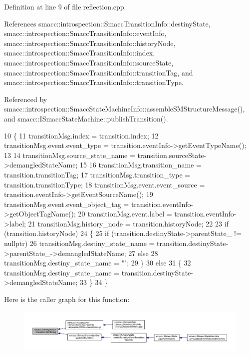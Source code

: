 Definition at line 9 of file reflection.\+cpp.



References smacc\+::introspection\+::\+Smacc\+Transition\+Info\+::destiny\+State, smacc\+::introspection\+::\+Smacc\+Transition\+Info\+::event\+Info, smacc\+::introspection\+::\+Smacc\+Transition\+Info\+::history\+Node, smacc\+::introspection\+::\+Smacc\+Transition\+Info\+::index, smacc\+::introspection\+::\+Smacc\+Transition\+Info\+::source\+State, smacc\+::introspection\+::\+Smacc\+Transition\+Info\+::transition\+Tag, and smacc\+::introspection\+::\+Smacc\+Transition\+Info\+::transition\+Type.



Referenced by smacc\+::introspection\+::\+Smacc\+State\+Machine\+Info\+::assemble\+S\+M\+Structure\+Message(), and smacc\+::\+I\+Smacc\+State\+Machine\+::publish\+Transition().


\begin{DoxyCode}
10 \{
11     transitionMsg.index = transition.index;
12     transitionMsg.event.event\_type = transition.eventInfo->getEventTypeName();
13 
14     transitionMsg.source\_state\_name = transition.sourceState->demangledStateName;
15 
16     transitionMsg.transition\_name = transition.transitionTag;
17     transitionMsg.transition\_type = transition.transitionType;
18     transitionMsg.event.event\_source = transition.eventInfo->getEventSourceName();
19     transitionMsg.event.event\_object\_tag = transition.eventInfo->getObjectTagName();
20     transitionMsg.event.label = transition.eventInfo->label;
21     transitionMsg.history\_node = transition.historyNode;
22 
23     \textcolor{keywordflow}{if} (transition.historyNode)
24     \{
25         \textcolor{keywordflow}{if} (transition.destinyState->parentState\_ != \textcolor{keyword}{nullptr})
26             transitionMsg.destiny\_state\_name = transition.destinyState->parentState\_->demangledStateName;
27         \textcolor{keywordflow}{else}
28             transitionMsg.destiny\_state\_name = \textcolor{stringliteral}{""};
29     \}
30     \textcolor{keywordflow}{else}
31     \{
32         transitionMsg.destiny\_state\_name = transition.destinyState->demangledStateName;
33     \}
34 \}
\end{DoxyCode}


Here is the caller graph for this function\+:
\nopagebreak
\begin{figure}[H]
\begin{center}
\leavevmode
\includegraphics[width=350pt]{namespacesmacc_1_1introspection_a6c1b51c4d44fd5e41fe218f1ee150681_icgraph}
\end{center}
\end{figure}


